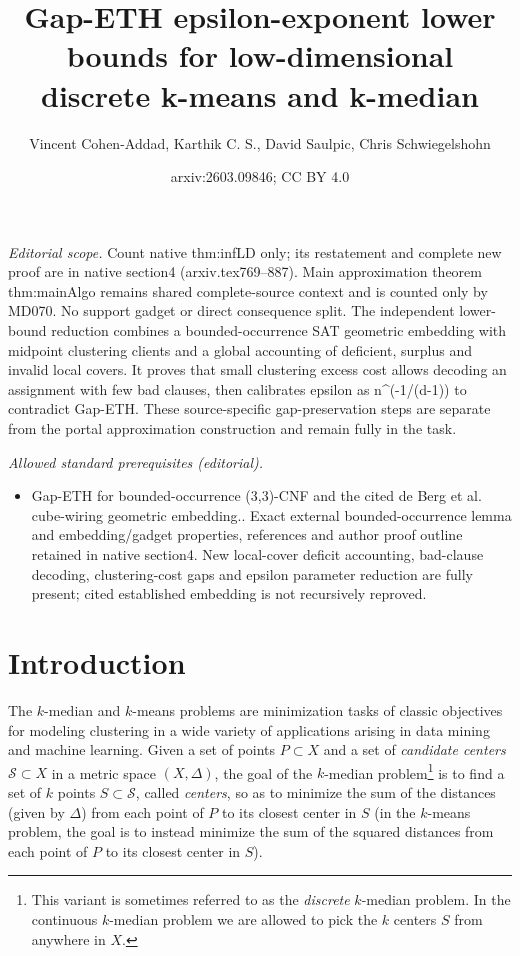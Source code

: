 \documentclass[11pt]{article}
\title{Gap-ETH epsilon-exponent lower bounds for low-dimensional discrete k-means and k-median}
\author{Vincent Cohen-Addad, Karthik C. S., David Saulpic, Chris Schwiegelshohn}
\date{arxiv:2603.09846; CC BY 4.0}
\newcommand{\calS}{\mathcal {S}}
\begin{document}
\maketitle
\noindent\textit{Editorial scope.} Count native thm:infLD only; its restatement and complete new proof are in native section4 (arxiv.tex769–887). Main approximation theorem thm:mainAlgo remains shared complete-source context and is counted only by MD070. No support gadget or direct consequence split. The independent lower-bound reduction combines a bounded-occurrence SAT geometric embedding with midpoint clustering clients and a global accounting of deficient, surplus and invalid local covers. It proves that small clustering excess cost allows decoding an assignment with few bad clauses, then calibrates epsilon as n\textasciicircum{}(-1/(d-1)) to contradict Gap-ETH. These source-specific gap-preservation steps are separate from the portal approximation construction and remain fully in the task.\par\medskip
\noindent\textit{Allowed standard prerequisites (editorial).}\begin{itemize}
\item Gap-ETH for bounded-occurrence (3,3)-CNF and the cited de Berg et al. cube-wiring geometric embedding.. Exact external bounded-occurrence lemma and embedding/gadget properties, references and author proof outline retained in native section4. New local-cover deficit accounting, bad-clause decoding, clustering-cost gaps and epsilon parameter reduction are fully present; cited established embedding is not recursively reproved.
\end{itemize}\medskip
\section{Introduction}
The $k$-median and $k$-means problems are minimization tasks of classic objectives for modeling
clustering in a wide variety of applications arising in data mining and
machine learning. Given a set of points $P\subset X$  and a set of \emph{candidate centers} $\calS \subset X$ in a metric space $(X, \Delta)$,
the goal of the $k$-median problem\footnote{This variant is sometimes referred to as the \emph{discrete} $k$-median problem. In the continuous $k$-median problem we are allowed to pick the $k$ centers $S$ from anywhere in $X$. } is to find a set of $k$ points $S \subset \calS$, called \emph{centers}, so as
to minimize the sum of the distances (given by $\Delta$) from each point of $P$ to its closest
center in $S$ (in the $k$-means problem, the goal is to instead minimize the sum of the squared distances from each point of $P$ to its closest center in $S$).
\end{document}

